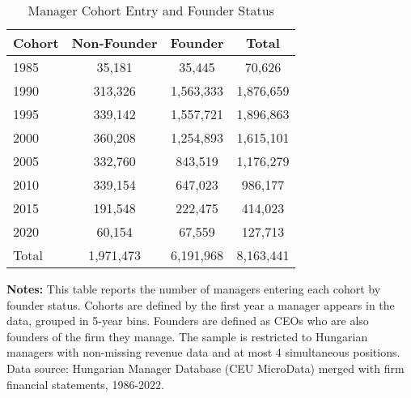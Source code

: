 \begin{table}[htbp]\centering
\caption{Manager Cohort Entry and Founder Status}\label{tab:cohort_founders}
\begin{threeparttable}
\begin{tabular}{lccc}
\toprule
Cohort & Non-Founder & Founder & Total \\
\midrule
1985 &       35,181 &       35,445 &       70,626 \\
1990 &      313,326 &    1,563,333 &    1,876,659 \\
1995 &      339,142 &    1,557,721 &    1,896,863 \\
2000 &      360,208 &    1,254,893 &    1,615,101 \\
2005 &      332,760 &      843,519 &    1,176,279 \\
2010 &      339,154 &      647,023 &      986,177 \\
2015 &      191,548 &      222,475 &      414,023 \\
2020 &       60,154 &       67,559 &      127,713 \\
\midrule
Total &    1,971,473 &    6,191,968 &    8,163,441 \\
\bottomrule
\end{tabular}
\begin{tablenotes}
\footnotesize
\item \textbf{Notes:} This table reports the number of managers entering each cohort by founder status. Cohorts are defined by the first year a manager appears in the data, grouped in 5-year bins. Founders are defined as CEOs who are also founders of the firm they manage. The sample is restricted to Hungarian managers with non-missing revenue data and at most 4 simultaneous positions. Data source: Hungarian Manager Database (CEU MicroData) merged with firm financial statements, 1986-2022.
\end{tablenotes}
\end{threeparttable}
\end{table}
